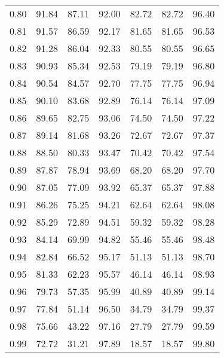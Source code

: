 \begin{tabular}{|c|c|c|c|c|c|c|}
      0.80 &     91.84 &     87.11 &      92.00 &   82.72 &      82.72 &         96.40 \\
      0.81 &     91.57 &     86.59 &      92.17 &   81.65 &      81.65 &         96.53 \\
      0.82 &     91.28 &     86.04 &      92.33 &   80.55 &      80.55 &         96.65 \\
      0.83 &     90.93 &     85.34 &      92.53 &   79.19 &      79.19 &         96.80 \\
      0.84 &     90.54 &     84.57 &      92.70 &   77.75 &      77.75 &         96.94 \\
      0.85 &     90.10 &     83.68 &      92.89 &   76.14 &      76.14 &         97.09 \\
      0.86 &     89.65 &     82.75 &      93.06 &   74.50 &      74.50 &         97.22 \\
      0.87 &     89.14 &     81.68 &      93.26 &   72.67 &      72.67 &         97.37 \\
      0.88 &     88.50 &     80.33 &      93.47 &   70.42 &      70.42 &         97.54 \\
      0.89 &     87.87 &     78.94 &      93.69 &   68.20 &      68.20 &         97.70 \\
      0.90 &     87.05 &     77.09 &      93.92 &   65.37 &      65.37 &         97.88 \\
      0.91 &     86.26 &     75.25 &      94.21 &   62.64 &      62.64 &         98.08 \\
      0.92 &     85.29 &     72.89 &      94.51 &   59.32 &      59.32 &         98.28 \\
      0.93 &     84.14 &     69.99 &      94.82 &   55.46 &      55.46 &         98.48 \\
      0.94 &     82.84 &     66.52 &      95.17 &   51.13 &      51.13 &         98.70 \\
      0.95 &     81.33 &     62.23 &      95.57 &   46.14 &      46.14 &         98.93 \\
      0.96 &     79.73 &     57.35 &      95.99 &   40.89 &      40.89 &         99.14 \\
      0.97 &     77.84 &     51.14 &      96.50 &   34.79 &      34.79 &         99.37 \\
      0.98 &     75.66 &     43.22 &      97.16 &   27.79 &      27.79 &         99.59 \\
      0.99 &     72.72 &     31.21 &      97.89 &   18.57 &      18.57 &         99.80 \\
\bottomrule
\end{tabular}
